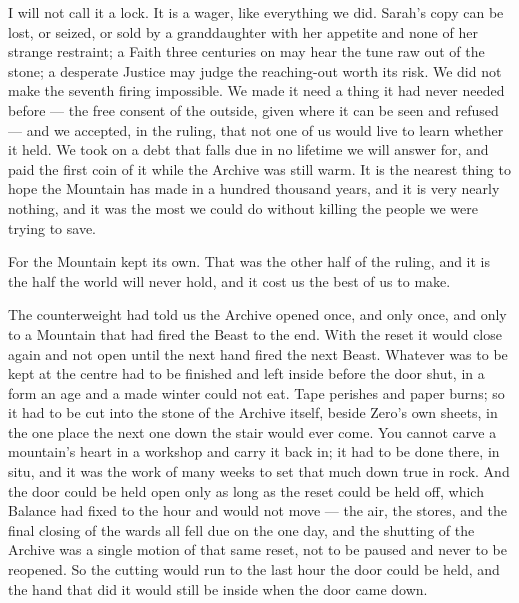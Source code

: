 I will not call it a lock. It is a wager, like everything we did. Sarah's copy can be lost, or seized, or sold by a granddaughter with her appetite and none of her strange restraint; a Faith three centuries on may hear the tune raw out of the stone; a desperate Justice may judge the reaching-out worth its risk. We did not make the seventh firing impossible. We made it need a thing it had never needed before --- the free consent of the outside, given where it can be seen and refused --- and we accepted, in the ruling, that not one of us would live to learn whether it held. We took on a debt that falls due in no lifetime we will answer for, and paid the first coin of it while the Archive was still warm. It is the nearest thing to hope the Mountain has made in a hundred thousand years, and it is very nearly nothing, and it was the most we could do without killing the people we were trying to save.

\ornament

For the Mountain kept its own. That was the other half of the ruling, and it is the half the world will never hold, and it cost us the best of us to make.\par

The counterweight had told us the Archive opened once, and only once, and only to a Mountain that had fired the Beast to the end. With the reset it would close again and not open until the next hand fired the next Beast. Whatever was to be kept at the centre had to be finished and left inside before the door shut, in a form an age and a made winter could not eat. Tape perishes and paper burns; so it had to be cut into the stone of the Archive itself, beside Zero's own sheets, in the one place the next one down the stair would ever come. You cannot carve a mountain's heart in a workshop and carry it back in; it had to be done there, in situ, and it was the work of many weeks to set that much down true in rock. And the door could be held open only as long as the reset could be held off, which Balance had fixed to the hour and would not move --- the air, the stores, and the final closing of the wards all fell due on the one day, and the shutting of the Archive was a single motion of that same reset, not to be paused and never to be reopened. So the cutting would run to the last hour the door could be held, and the hand that did it would still be inside when the door came down.\par

